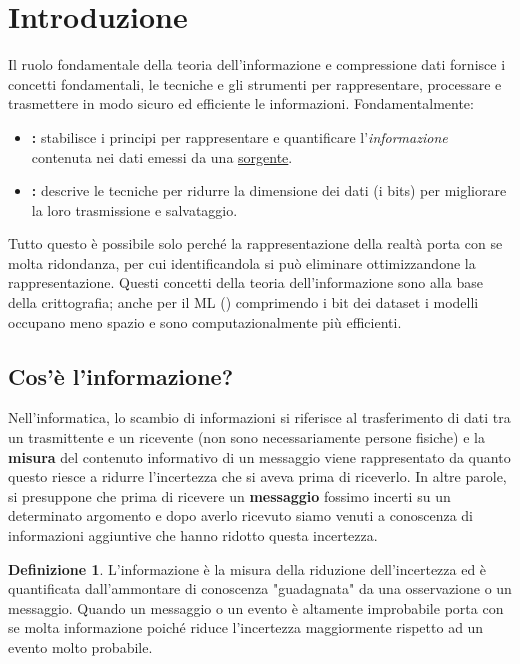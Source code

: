 \documentclass{article}
\title{\texten{Information theory}}
\author{Emanuele Di Prima}
\date{Marzo 2026}
\theoremstyle{definition}
\newtheorem{definizione}{Definizione}[section]
\numberwithin{equation}{section}
\begin{document}
\maketitle
\tableofcontents
\newpage
\section{Introduzione}
Il ruolo fondamentale della teoria dell'informazione e compressione dati fornisce i concetti fondamentali, le tecniche e gli strumenti per rappresentare, processare e trasmettere in modo sicuro ed efficiente le informazioni. Fondamentalmente:
\begin{itemize}
    \item \textbf{:} stabilisce i principi per rappresentare e quantificare l'\emph{informazione} contenuta nei dati emessi da una \uline{sorgente}.
    \item \textbf{:} descrive le tecniche per ridurre la dimensione dei dati (i bits) per migliorare la loro trasmissione e salvataggio.
\end{itemize}
Tutto questo è possibile solo perché la rappresentazione della realtà porta con se molta ridondanza, per cui identificandola si può eliminare ottimizzandone la rappresentazione. Questi concetti della teoria dell'informazione sono alla base della crittografia; anche per il ML () comprimendo i bit dei dataset i modelli occupano meno spazio e sono computazionalmente più efficienti.

\subsection{Cos'è l'informazione?}
Nell'informatica, lo scambio di informazioni si riferisce al trasferimento di dati tra un trasmittente e un ricevente (non sono necessariamente persone fisiche) e la \textbf{misura} del contenuto informativo di un messaggio viene rappresentato da quanto questo riesce a ridurre l'incertezza che si aveva prima di riceverlo. In altre parole, si presuppone che prima di ricevere un \textbf{messaggio} fossimo incerti su un determinato argomento e dopo averlo ricevuto siamo venuti a conoscenza di informazioni aggiuntive che hanno ridotto questa incertezza.

\begin{definizione}
    L'informazione è la misura della riduzione dell'incertezza ed è quantificata dall'ammontare di conoscenza "guadagnata" da una osservazione o un messaggio.  Quando un messaggio o un evento è altamente improbabile porta con se molta informazione poiché riduce l'incertezza maggiormente rispetto ad un evento molto probabile.
\end{definizione}
\end{document}
